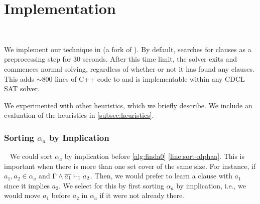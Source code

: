 \section{Implementation}~\label{sec:implementation}

We implement our technique in \tool (a fork of \cadical
). By default, \tool searches for \pr clauses as a preprocessing step for 30
seconds. After this time limit, the solver exits and commences normal solving,
regardless of whether or not it has found any \pr clauses. This adds $\sim\!800$ lines
of C++ code to \cadical and is implementable within any CDCL SAT solver.
 

We experimented with other heuristics, which we briefly describe.
We include an evaluation of the heuristics in \autoref{subsec:heuristics}.





\subsubsection{Sorting $\alpha_a$ by Implication}~\label{subsubsec:impordering}
We could sort $\alpha_a$ by implication before \autoref{alg:finda0}
\autoref{line:sort-alphaa}. This is important when there is more than one set
cover of the same size. For instance, if  $a_1, a_2 \in \alpha_a$ and
$\Gamma \land \overline{a_1} \vdash_1 a_2$. Then, we would prefer to learn a clause with 
$a_1$ since it implies $a_2$. We select for this by first sorting $\alpha_a$ by
implication, i.e., we would move $a_1$ before $a_2$ in $\alpha_a$ if it were not
already there.

